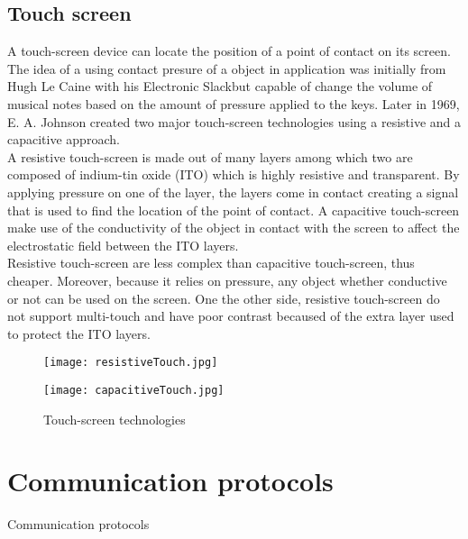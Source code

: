 \subsection{Touch screen}
A touch-screen device can locate the position of a point of contact on its screen. The idea of a using  contact presure of a object in application was initially from Hugh Le Caine with his Electronic Slackbut capable of change the volume of musical notes based on the amount of pressure applied to the keys. Later in 1969, E. A. Johnson created two major touch-screen technologies using a resistive and a capacitive approach. \\
A resistive touch-screen is made out of many layers among which two are composed of indium-tin oxide (ITO) which is highly resistive and transparent. By applying pressure on one of the layer, the layers come in contact creating a signal that is used to find the location of the point of contact. A capacitive touch-screen make use of the conductivity of the object in contact with the screen to affect the electrostatic field between the ITO layers. \\
Resistive touch-screen are less complex than capacitive touch-screen, thus cheaper. Moreover, because it relies on pressure, any object whether conductive or not can be used on the screen. One the other side, resistive touch-screen do not support multi-touch and have poor contrast becaused of the extra layer used to protect the ITO layers.
\begin{figure}[ht]
\centering
\begin{minipage}[b]{0.45\textwidth}
\texttt{[image: resistiveTouch.jpg]}
\label{fig:philips1}
\end{minipage}
\begin{minipage}[b]{0.45\textwidth}
\texttt{[image: capacitiveTouch.jpg]}
\label{fig:philips2}
\end{minipage}
\caption{Touch-screen technologies}
\label{philips}
\end{figure}    


\section{Communication protocols}
Communication protocols

